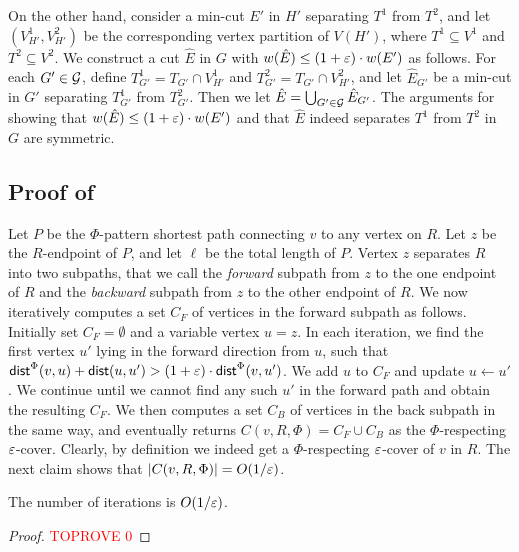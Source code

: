 On the other hand, consider a min-cut $E'$ in $H'$ separating $T^1$ from $T^2$, and let $(V_{H'}^1,V_{H'}^2)$ be the corresponding vertex partition of $V(H')$, where $T^1\subseteq V^1$ and $T^2\subseteq V^2$. 
We construct a cut $\hat E$ in $G$ with $w(\hat E)\le (1+{\varepsilon})\cdot w(E')$ as follows. 
For each $G'\in {\mathcal{G}}$, define $T^1_{G'}=T_{G'}\cap V^1_{H'}$ and $T^2_{G'}=T_{G'}\cap V^2_{H'}$, and let $\hat E_{G'}$ be a min-cut in $G'$ separating $T^1_{G'}$ from $T^2_{G'}$. 
Then we let $\hat E=\bigcup_{G'\in {\mathcal{G}}}\hat E_{G'}$.
The arguments for showing that $w(\hat E)\le (1+{\varepsilon})\cdot w(E')$ and that $\hat E$ indeed separates $T^1$ from $T^2$ in $G$ are symmetric.

\subsection{Proof of }
\label{apd: Proof of lem: pattern cover}

Let $P$ be the $\Phi$-pattern shortest path connecting $v$ to any vertex on $R$. Let $z$ be the $R$-endpoint of $P$, and let $\ell$ be the total length of $P$.
Vertex $z$ separates $R$ into two subpaths, that we call the \emph{forward} subpath from $z$ to the one endpoint of $R$ and the \emph{backward} subpath from $z$ to the other endpoint of $R$.
We now iteratively computes a set $C_F$ of vertices in the forward subpath as follows.
Initially set $C_F=\emptyset$ and a variable vertex $u=z$. In each iteration, we find the first vertex $u'$ lying in the forward direction from $u$, such that 
$\textnormal{\textsf{dist}}^{\Phi}(v,u)+\textnormal{\textsf{dist}}(u,u')> (1+{\varepsilon})\cdot \textnormal{\textsf{dist}}^{\Phi}(v,u')$. We add $u$ to $C_F$ and update $u\leftarrow u'$. We continue until we cannot find any such $u'$ in the forward path and obtain the resulting $C_F$.
We then computes a set $C_B$ of vertices in the back subpath in the same way, and eventually returns $C(v,R,\Phi)=C_F\cup C_B$ as the $\Phi$-respecting ${\varepsilon}$-cover.
Clearly, by definition we indeed get a $\Phi$-respecting ${\varepsilon}$-cover of $v$ in $R$. The next claim shows that $|C(v,R,\Phi)|=O(1/{\varepsilon})$.

\begin{claim}
The number of iterations  is $O(1/{\varepsilon})$.
\end{claim}
\begin{proof}\textcolor{red}{TOPROVE 0}\end{proof}





